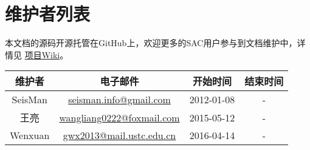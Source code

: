 {\section*{维护者列表}}

本文档的源码开源托管在GitHub上，欢迎更多的SAC用户参与到文档维护中，详情见
\href{https://github.com/seisman/SAC_Docs_zh/wiki}{项目Wiki}。

\begin{table}[H]
\centering
\begin{tabular}{cccc}
\toprule
维护者      & 电子邮件              &   开始时间    &   结束时间     \\
\midrule
SeisMan  & \url{seisman.info@gmail.com}    &  2012-01-08   &   -     \\
王亮     & \url{wangliang0222@foxmail.com} &  2015-05-12   &   -     \\
Wenxuan  & \url{gwx2013@mail.ustc.edu.cn}  &  2016-04-14   &   -     \\
\bottomrule
\end{tabular}
\end{table}
